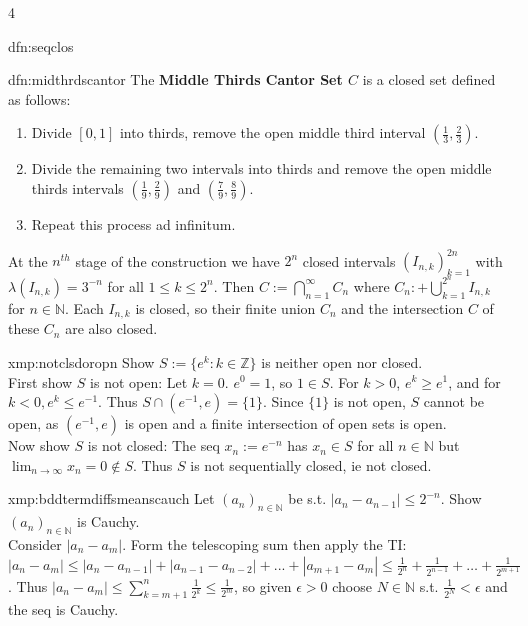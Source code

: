 \documentclass[landscape, 8pt]{extarticle}
\begin{document}
\begin{multicols*}{4}
\begin{dfn}{dfn:seqclos}{ }
		\end{dfn}
		
		
		\begin{dfn}{dfn:midthrdscantor}{ }
			The \textbf{Middle Thirds Cantor Set $C$} is a closed set defined as follows: 
			\begin{enumerate}[label=(\arabic*)]
				\item Divide $[0, 1]$ into thirds, remove the open middle third interval $(\frac{1}{3}, \frac{2}{3})$.
				\item Divide the remaining two intervals into thirds and remove the open middle thirds intervals $(\frac{1}{9}, \frac{2}{9})$ and $(\frac{7}{9}, \frac{8}{9})$.
				\item Repeat this process ad infinitum.
			\end{enumerate}
			At the $n^{th}$ stage of the construction we have $2^n$ closed intervals $(I_{n, k})_{k=1}^{2n}$ with $\lambda(I_{n, k}) = 3^{-n}$ for all $1 \le k \le 2^n$. Then $C := \bigcap_{n =1}^{\infty}C_n$ where $C_n :+ \bigcup_{k =1}^{2^n}I_{n, k}$ for $n \in \mathbb{N}$. Each $I_{n, k}$ is closed, so their finite union $C_n$ and the intersection $C$ of these $C_n$ are also closed.
			
		\end{dfn}
		
		
		\begin{xmp}{xmp:notclsdoropn}{ }
			Show $S := \{e^k : k\in \mathbb{Z}\}$ is neither open nor closed.\\
			First show $S$ is not open: Let $k=0$. $e^0 = 1$, so $1\in S$. For $k > 0$, $e^k \ge e^1$, and for $k < 0, e^k \le e^{-1}$. Thus $S \cap (e^{-1}, e) = \{1\}$. Since $\{1\}$ is not open, $S$ cannot be open, as $(e^{-1}, e)$ is open and a finite intersection of open sets is open.\\
			Now show $S$ is not closed: The seq $x_n := e^{-n}$ has $x_n\in S$ for all $n\in \mathbb{N}$ but $\lim_{n\to \infty} x_n = 0 \notin S$. Thus $S$ is not sequentially closed, ie not closed.
			
		\end{xmp}
		
		
		\begin{xmp-s}{xmp:bddtermdiffsmeanscauch}{ }
			Let $(a_n)_{n\in \mathbb{N}}$ be s.t. $\left|a_n - a_{n-1}\right| \le 2^{-n}$. Show $(a_n)_{n\in \mathbb{N}}$ is Cauchy.\\
			Consider $\left|a_n - a_m\right|$. Form the telescoping sum then apply the TI: $\left|a_n - a_m\right| \le \left|a_n - a_{n-1}\right| + \left|a_{n-1} - a_{n-2}\right| + ... + \left|a_{m+1} - a_m\right| \le \frac{1}{2^n} + \frac{1}{2^{n-1}} + \dots + \frac{1}{2^{m+1}}$. Thus $\left|a_n - a_m\right| \le \sum_{k=m+1}^{n} \frac{1}{2^k} \le \frac{1}{2^m}$, so given $\epsilon > 0$ choose $N\in \mathbb{N}$ s.t. $\frac{1}{2^N} <\epsilon$ and the seq is Cauchy.
			

\end{xmp-s}
\end{multicols*}
\end{document}
